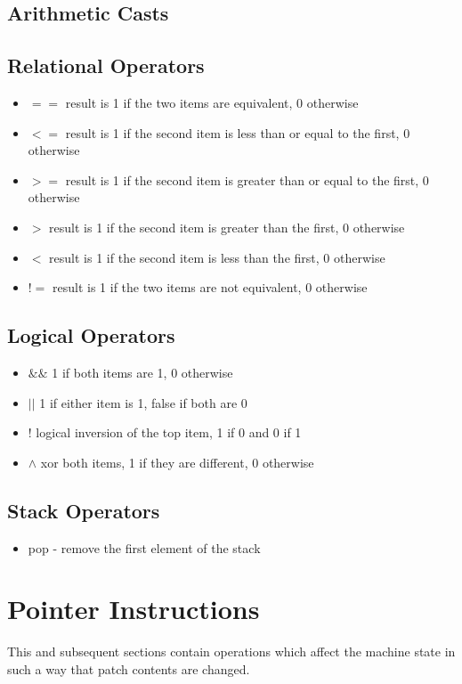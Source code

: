 \subsection{Arithmetic Casts}
\subsection{Relational Operators}
\begin{itemize}
\item $==$ result is 1 if the two items are equivalent, 0 otherwise
\item $<=$ result is 1 if the second item is less than or equal to the first, 0 otherwise
\item $>=$ result is 1 if the second item is greater than or equal to the first, 0 otherwise
\item $>$ result is 1 if the second item is greater than the first, 0 otherwise
\item $<$ result is 1 if the second item is less than the first, 0 otherwise
\item $!=$ result is 1 if the two items are not equivalent, 0 otherwise
\end{itemize}

\subsection{Logical Operators}
\begin{itemize}
\item $\&\&$ 1 if both items are 1, 0 otherwise
\item $||$ 1 if either item is 1, false if both are 0
\item $!$ logical inversion of the top item, 1 if 0 and 0 if 1
\item $\wedge$ xor both items, 1 if they are different, 0 otherwise
\end{itemize}

\subsection{Stack Operators}
\begin{itemize}
\item pop - remove the first element of the stack
\end{itemize}

\section{Pointer Instructions}
This and subsequent sections contain operations which affect the machine state in such a way that patch contents are changed.

